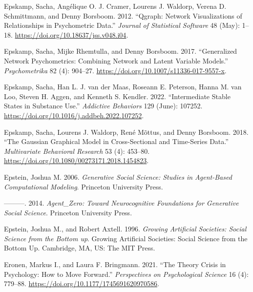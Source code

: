 \documentclass[
  a4paper,
  DIV=11,
  numbers=noendperiod,
  oneside]{scrreprt}
\newlength{\cslhangindent}
\newenvironment{CSLReferences}[2] %
 {\begin{list}{}{%
  \setlength{\itemindent}{0pt}
  \setlength{\leftmargin}{0pt}
  \setlength{\parsep}{0pt}
  \ifodd #1
   \setlength{\leftmargin}{\cslhangindent}
   \setlength{\itemindent}{-1\cslhangindent}
  \fi
  \setlength{\itemsep}{#2\baselineskip}}}
 {\end{list}}
\begin{document}
\begin{CSLReferences}{1}{0}
Epskamp, Sacha, Angélique O. J. Cramer, Lourens J. Waldorp, Verena D.
Schmittmann, and Denny Borsboom. 2012. {``Qgraph: {Network
Visualizations} of {Relationships} in {Psychometric Data}.''}
\emph{Journal of Statistical Software} 48 (May): 1--18.
\url{https://doi.org/10.18637/jss.v048.i04}.

Epskamp, Sacha, Mijke Rhemtulla, and Denny Borsboom. 2017.
{``Generalized {Network Psychometrics}: {Combining Network} and {Latent
Variable Models}.''} \emph{Psychometrika} 82 (4): 904--27.
\url{https://doi.org/10.1007/s11336-017-9557-x}.

Epskamp, Sacha, Han L. J. van der Maas, Roseann E. Peterson, Hanna M.
van Loo, Steven H. Aggen, and Kenneth S. Kendler. 2022. {``Intermediate
Stable States in Substance Use.''} \emph{Addictive Behaviors} 129
(June): 107252. \url{https://doi.org/10.1016/j.addbeh.2022.107252}.

Epskamp, Sacha, Lourens J. Waldorp, René Mõttus, and Denny Borsboom.
2018. {``The {Gaussian Graphical Model} in {Cross-Sectional} and
{Time-Series Data}.''} \emph{Multivariate Behavioral Research} 53 (4):
453--80. \url{https://doi.org/10.1080/00273171.2018.1454823}.

Epstein, Joshua M. 2006. \emph{Generative {Social Science}: {Studies} in
{Agent-Based Computational Modeling}}. {Princeton University Press}.

---------. 2014. \emph{Agent\_{Zero}: {Toward Neurocognitive
Foundations} for {Generative Social Science}}. {Princeton University
Press}.

Epstein, Joshua M., and Robert Axtell. 1996. \emph{Growing Artificial
Societies: {Social} Science from the Bottom up}. Growing Artificial
Societies: {Social} Science from the Bottom Up. {Cambridge, MA, US}:
{The MIT Press}.

Eronen, Markus I., and Laura F. Bringmann. 2021. {``The {Theory Crisis}
in {Psychology}: {How} to {Move Forward}.''} \emph{Perspectives on
Psychological Science} 16 (4): 779--88.
\url{https://doi.org/10.1177/1745691620970586}.


\end{CSLReferences}
\end{document}
